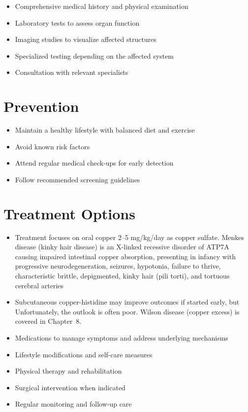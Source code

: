 \begin{itemize}[noitemsep]
  \item Comprehensive medical history and physical examination
  \item Laboratory tests to assess organ function
  \item Imaging studies to visualize affected structures
  \item Specialized testing depending on the affected system
  \item Consultation with relevant specialists
\end{itemize}
\section{Prevention}
\begin{itemize}[noitemsep]
  \item Maintain a healthy lifestyle with balanced diet and exercise
  \item Avoid known risk factors
  \item Attend regular medical check-ups for early detection
  \item Follow recommended screening guidelines
\end{itemize}
\section{Treatment Options}
\begin{itemize}[noitemsep]
  \item Treatment focuses on oral copper 2--5 mg/kg/day as copper sulfate. Menkes disease (kinky hair disease) is an X-linked recessive disorder of ATP7A causing impaired intestinal copper absorption, presenting in infancy with progressive neurodegeneration, seizures, hypotonia, failure to thrive, characteristic brittle, depigmented, kinky hair (pili torti), and tortuous cerebral arteries
  \item Subcutaneous copper-histidine may improve outcomes if started early, but Unfortunately, the outlook is often poor. Wilson disease (copper excess) is covered in Chapter~8.
  \item Medications to manage symptoms and address underlying mechanisms
  \item Lifestyle modifications and self-care measures
  \item Physical therapy and rehabilitation
  \item Surgical intervention when indicated
  \item Regular monitoring and follow-up care
\end{itemize}
